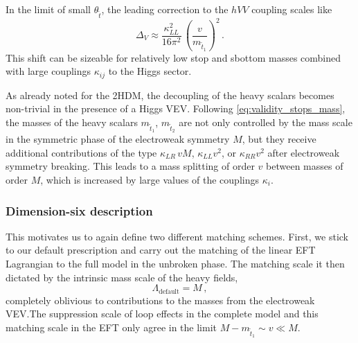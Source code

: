 In the limit of small $\theta_{\tilde{t}}$, the leading correction to
the $hVV$ coupling scales like
%
\begin{equation}
  \Delta_V
  \approx
  \frac{\kappa_{LL}^2}{16 \pi^2} \, \left( \frac{v}{m_{\tilde{t}_{1}}} \right)^2 \,.
  \label{eq:validity_stops_couplings}
\end{equation}
%
This shift can be sizeable for relatively low stop and sbottom masses
combined with large couplings $\kappa_{ij}$ to the Higgs sector.

As already noted for the 2HDM, the decoupling of the heavy scalars
becomes non-trivial in the presence of a Higgs VEV. Following
\autoref{eq:validity_stops_mass}, the masses of the heavy scalars
$m_{\tilde{t}_1}$, $m_{\tilde{t}_2}$ are not only controlled by the
mass scale in the symmetric phase of the electroweak symmetry $M$, but
they receive additional contributions of the type $\kappa_{LR} \, vM$,
$\kappa_{LL} v^2$, or $\kappa_{RR} v^2$ after electroweak symmetry
breaking. This leads to a mass splitting of order $v$ between masses
of order $M$, which is increased by large values of the couplings
$\kappa_{i}$.
%



\subsubsection{Dimension-six description}

This motivates us to again define two different matching
schemes. First, we stick to our default prescription and carry out the
matching of the linear EFT Lagrangian to the full model in the
unbroken phase. The matching scale it then dictated by the intrinsic
mass scale of the heavy fields,
%
\begin{equation}
  \Lambda_{\text{default}} = M \,,
\end{equation}
%
completely oblivious to contributions to the masses from the
electroweak VEV.The suppression scale of loop effects in the complete
model and this matching scale in the EFT only agree in the limit
$M - m_{\tilde{t}_{1}} \sim v \ll M$.

